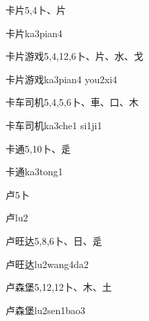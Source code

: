 \begin{entry}{卡片}{5,4}{⼘、⽚}
  \begin{phonetics}{卡片}{ka3pian4}
  \end{phonetics}
\end{entry}

\begin{entry}{卡片游戏}{5,4,12,6}{⼘、⽚、⽔、⼽}
  \begin{phonetics}{卡片游戏}{ka3pian4 you2xi4}
  \end{phonetics}
\end{entry}

\begin{entry}{卡车司机}{5,4,5,6}{⼘、⾞、⼝、⽊}
  \begin{phonetics}{卡车司机}{ka3che1 si1ji1}
  \end{phonetics}
\end{entry}

\begin{entry}{卡通}{5,10}{⼘、⾡}
  \begin{phonetics}{卡通}{ka3tong1}
  \end{phonetics}
\end{entry}

\begin{entry}{卢}{5}{⼘}
  \begin{phonetics}{卢}{lu2}
  \end{phonetics}
\end{entry}

\begin{entry}{卢旺达}{5,8,6}{⼘、⽇、⾡}
  \begin{phonetics}{卢旺达}{lu2wang4da2}
  \end{phonetics}
\end{entry}

\begin{entry}{卢森堡}{5,12,12}{⼘、⽊、⼟}
  \begin{phonetics}{卢森堡}{lu2sen1bao3}
  \end{phonetics}
\end{entry}


